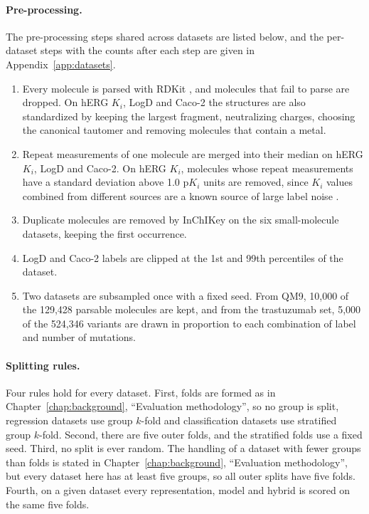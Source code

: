 \paragraph{Pre-processing.} The pre-processing steps shared across datasets are listed below, and the per-dataset steps with the counts after each step are given in Appendix~\ref{app:datasets}.
\begin{enumerate}[leftmargin=*]
    \item Every molecule is parsed with RDKit \citep{rdkit}, and molecules that fail to parse are dropped. On hERG $K_i$, LogD and Caco-2 the structures are also standardized by keeping the largest fragment, neutralizing charges, choosing the canonical tautomer and removing molecules that contain a metal.
    \item Repeat measurements of one molecule are merged into their median on hERG $K_i$, LogD and Caco-2. On hERG $K_i$, molecules whose repeat measurements have a standard deviation above 1.0 p$K_i$ units are removed, since $K_i$ values combined from different sources are a known source of large label noise \citep{landrum2024}.
    \item Duplicate molecules are removed by InChIKey on the six small-molecule datasets, keeping the first occurrence.
    \item LogD and Caco-2 labels are clipped at the 1st and 99th percentiles of the dataset.
    \item Two datasets are subsampled once with a fixed seed. From QM9, 10,000 of the 129,428 parsable molecules are kept, and from the trastuzumab set, 5,000 of the 524,346 variants are drawn in proportion to each combination of label and number of mutations.
\end{enumerate}

\paragraph{Splitting rules.} Four rules hold for every dataset. First, folds are formed as in Chapter~\ref{chap:background}, ``Evaluation methodology'', so no group is split, regression datasets use group $k$-fold and classification datasets use stratified group $k$-fold. Second, there are five outer folds, and the stratified folds use a fixed seed. Third, no split is ever random. The handling of a dataset with fewer groups than folds is stated in Chapter~\ref{chap:background}, ``Evaluation methodology'', but every dataset here has at least five groups, so all outer splits have five folds. Fourth, on a given dataset every representation, model and hybrid is scored on the same five folds.

